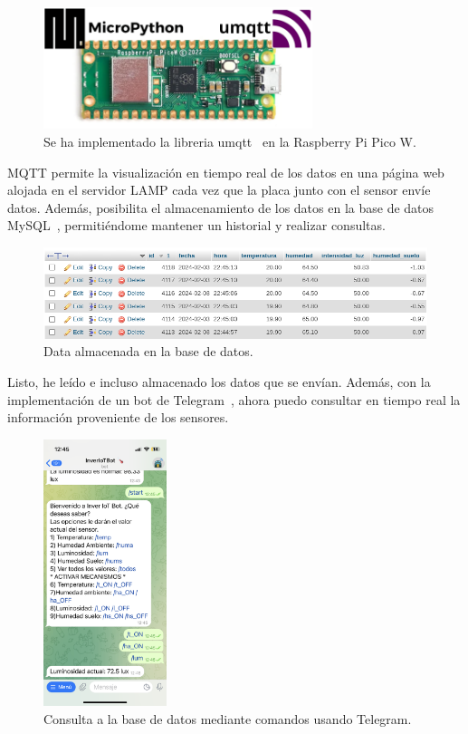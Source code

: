 \begin{figure}[h]
	\centering
	\includegraphics[width=0.7\textwidth]{img/herramientas/rpipicow_umqtt.png}
	\caption{Se ha implementado la libreria umqtt~\cite{misc:umqtt} en la Raspberry Pi Pico W.} \label{Img:rpipicow_umqtt}
\end{figure}

MQTT permite la visualización en tiempo real de los datos en una página web alojada en el servidor LAMP cada vez que la placa junto con el sensor envíe datos. Además, posibilita el almacenamiento de los datos en la base de datos MySQL~\cite{misc:Mysql}, permitiéndome mantener un historial y realizar consultas.

\begin{figure}[h]
	\centering
	\includegraphics[width=1\textwidth]{img/desarrollo/mysql_data.png}
	\caption{Data almacenada en la base de datos.}
\end{figure}

Listo, he leído e incluso almacenado los datos que se envían. Además, con la implementación de un bot de Telegram~\cite{misc:Telegram}, ahora puedo consultar en tiempo real la información proveniente de los sensores.

\begin{figure}[h]
	\centering
	\includegraphics[width=0.32\textwidth]{img/desarrollo/BotTelegram_comandos.png}
	\caption{Consulta a la base de datos mediante comandos usando Telegram.}
\end{figure}

